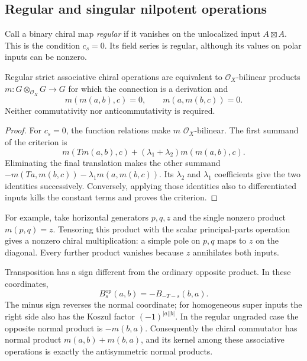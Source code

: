 \subsection{Regular and singular nilpotent operations}

Call\label{e1c:def:regular-binary-input} a binary chiral map \emph{regular} if it vanishes on the
unlocalized input \(A\boxtimes A\). This is the condition
\(c_s=0\). Its field series is regular, although its values
on polar inputs can be nonzero.

\begin{corollary}\label{e1c:cor:regular}
Regular strict associative chiral operations are equivalent
to \(\mathcal O_X\)-bilinear products
\(m:G\otimes_{\mathcal O_X}G\to G\)
for which the connection is a derivation and
\[
 m(m(a,b),c)=0,
 \qquad m(a,m(b,c))=0.
\]
Neither commutativity nor anticommutativity is required.
\end{corollary}

\begin{proof}
For \(c_s=0\), the function relations make \(m\)
\(\mathcal O_X\)-bilinear. The first summand of the criterion is
\[
 m(Tm(a,b),c)+(\lambda_1+\lambda_2)m(m(a,b),c).
\]
Eliminating the final translation makes the other summand
\(-m(Ta,m(b,c))-\lambda_1m(a,m(b,c))\).
Its \(\lambda_2\) and \(\lambda_1\) coefficients give the
two identities successively. Conversely, applying those
identities also to differentiated inputs kills the constant
terms and proves the criterion.
\end{proof}

For\label{e1c:def:three-generator-nilpotent-example} example, take horizontal generators \(p,q,z\) and the
single nonzero product \(m(p,q)=z\). Tensoring this product
with the scalar principal-parts operation gives a nonzero
chiral multiplication: a simple pole on \(p,q\) maps to
\(z\) on the diagonal. Every further product vanishes because
\(z\) annihilates both inputs.

Transposition has a sign different from the ordinary opposite
product. In these coordinates,
\[
 B_s^{\mathrm{op}}(a,b)=-B_{-T-s}(b,a).
\]
The minus sign reverses the normal coordinate; for homogeneous
super inputs the right side also has the Koszul factor
\((-1)^{|a||b|}\). In the regular ungraded case the opposite
normal product is \(-m(b,a)\). Consequently the chiral
commutator has normal product \(m(a,b)+m(b,a)\), and its
kernel among these associative operations is exactly the
antisymmetric normal products.

